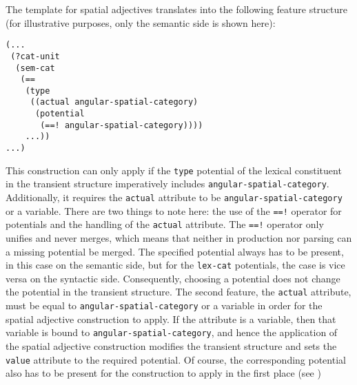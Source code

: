 The template for spatial adjectives translates into the following 
feature structure (for illustrative purposes, only the semantic 
side is shown here):
\ea
\begin{lstlisting}
(...
 (?cat-unit
  (sem-cat 
   (== 
    (type
     ((actual angular-spatial-category)
      (potential 
       (==! angular-spatial-category))))
    ...))
...)
\end{lstlisting}
\z
This construction can only apply if the {\footnotesize\tt type} potential 
of the lexical constituent in the transient structure imperatively includes 
{\footnotesize\tt angular-spatial-category}. Additionally,
it requires the {\footnotesize\tt actual} attribute
to be {\footnotesize\tt angular-spatial-category} or a variable. There are two
things to note here: the use of the {\footnotesize\verb|==!|} operator for 
potentials and the handling of the {\footnotesize\tt actual} attribute. 
The {\footnotesize\verb|==!|} operator only unifies and never merges, 
which means that neither in production nor parsing can a missing 
potential be merged. The specified potential always has to be present, 
in this case on the semantic side, but for the {\footnotesize\tt lex-cat} 
potentials, the case is vice versa on the 
syntactic side. Consequently, choosing a potential does not 
change the potential in the transient structure. 
The second feature, the {\footnotesize\tt actual} attribute, must be equal 
to {\footnotesize\tt angular-spatial-category} or a variable in order for the spatial 
adjective construction to apply. If the attribute
is a variable, then that variable is bound to {\footnotesize\tt angular-spatial-category}, 
and hence the application of the spatial adjective construction 
modifies the transient structure and sets the {\footnotesize\tt value} attribute 
to the required potential. Of course, the corresponding potential also 
has to be present for the construction to
apply in the first place (see )

